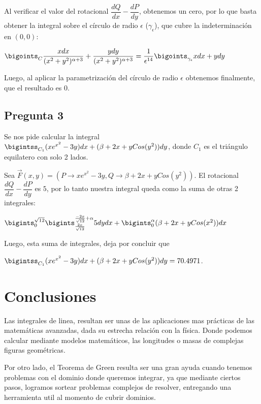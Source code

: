 \documentclass[12pt,letterpaper]{article}
\begin{document}
Al verificar el valor del rotacional $\dfrac{dQ}{dx}-\dfrac{dP}{dy}$, obtenemos un cero, por lo que basta obtener la integral sobre el círculo de radio $\epsilon$ ($\gamma_\epsilon$), que cubre la indeterminación en $(0,0)$:

\begin{center}$\bigoints_C \dfrac{xdx}{(x^2+y^2)^{\alpha+3}} + \dfrac{ydy}{(x^2+y^2)^{\alpha+3}} = \dfrac{1}{\epsilon^{14}}\bigoints_{\gamma_\epsilon} xdx+ydy$\end{center}

Luego, al aplicar la parametrización del círculo de radio $\epsilon$ obtenemos finalmente, que el resultado es 0.

\subsection{Pregunta 3}
Se nos pide calcular la integral $\bigintss_{C_1} (xe^{x^2}-3y)dx + (\beta+2x+yCos(y^2))dy$, donde $C_1$ es el triángulo equilatero con solo 2 lados.

Sea $\vec{F}(x,y)=(P\rightarrow xe^{x^2}-3y,Q\rightarrow\beta+2x+yCos(y^2))$. El rotacional $\dfrac{dQ}{dx}-\dfrac{dP}{dy}$ es $5$, por lo tanto nuestra integral queda como la suma de otras 2 integrales:

\begin{center}$\bigints_0^{\sqrt{12}}\bigints_{\frac{2x}{\sqrt{12}}}^{\frac{-2x}{\sqrt{12}}+\alpha} 5dydx + \bigints_0^{\alpha}(\beta+2x+yCos(x^2))dx$\end{center}

Luego, esta suma de integrales, deja por concluir que

 $\bigintss_{C_1} (xe^{x^2}-3y)dx + (\beta+2x+yCos(y^2))dy = 70.4971$.
\section{Conclusiones}

Las integrales de linea, resultan ser unas de las aplicaciones mas prácticas de las matemáticas avanzadas, dada su estrecha relación con la física. Donde podemos calcular mediante modelos matemáticos, las longitudes o masas de complejas figuras geométricas.

Por otro lado, el Teorema de Green resulta ser una gran ayuda cuando tenemos problemas con el dominio donde queremos integrar, ya que mediante ciertos pasos, logramos sortear problemas complejos de resolver, entregando una herramienta util al momento de cubrir dominios.


\end{document}
